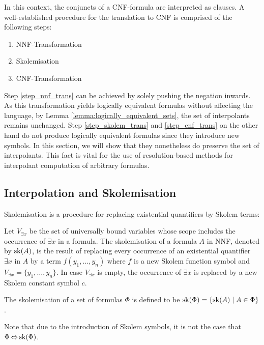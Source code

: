 In this context, the conjuncts of a CNF-formula are interpreted as clauses.
A well-established procedure for the translation to CNF is comprised of the following steps:

\begin{enumerate}
		\item NNF-Transformation \label{step_nnf_trans}
		\item Skolemisation \label{step_skolem_trans}
		\item CNF-Transformation \label{step_cnf_trans}
\end{enumerate}

Step \ref{step_nnf_trans} can be achieved by solely pushing the negation inwards.
As this transformation yields logically equivalent formulas without affecting the language, by Lemma \ref{lemma:logically_equivalent_sets}, the set of interpolants remains unchanged.
Step \ref{step_skolem_trans} and \ref{step_cnf_trans} on the other hand do not produce logically equivalent formulas since they introduce new symbols.
In this section, we will show that they nonetheless do preserve the set of interpolants.
This fact is vital for the use of resolution-based methods for interpolant computation of arbitrary formulas.


\subsection{Interpolation and Skolemisation}

Skolemisation is a procedure for replacing existential quantifiers by Skolem terms:

\begin{defi}
	Let $V_{\exists x}$ be the set of universally bound variables whose scope includes
	the occurrence of $\exists x$ in a formula.
	The skolemisation of a formula $A$ in NNF, denoted by $\operatorname{sk}(A)$, is the result of replacing every occurrence of an existential quantifier $\exists x$ in $A$ by a term $f(y_1, \ldots, y_n)$ where $f$ is a new Skolem function symbol and $V_{\exists x} = \{y_1, \ldots, y_n\}$.
	In case $V_{\exists x}$ is empty, the occurrence of $\exists x$ is replaced by a new Skolem constant symbol $c$.

	The skolemisation of a set of formulas $\Phi$ is defined to be $\operatorname{sk}(\Phi) = \{ \operatorname{sk}(A) \mid A \in \Phi \}$.
\end{defi}

Note that due to the introduction of Skolem symbols, it is not the case that $\Phi \operatorname{\Leftrightarrow} \operatorname{sk}(\Phi)$.

